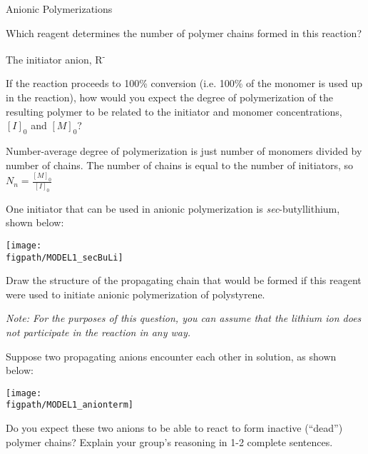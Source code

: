 \begin{activity}{Anionic Polymerizations}
\begin{ctqs}

	
	\question Which reagent determines the number of polymer chains formed in this reaction?
	
		\begin{solution}[0.25in]
			The initiator anion, R\textsuperscript{-}
		\end{solution}
	
	\question If the reaction proceeds to 100\% conversion (i.e. 100\% of the monomer is used up in the reaction), how would you expect the degree of polymerization of the resulting polymer to be related to the initiator and monomer concentrations, $[I]_0$ and $[M]_0$?
	
		\begin{solution}[0.5in]
			Number-average degree of polymerization is just number of monomers divided by number of chains.  The number of chains is equal to the number of initiators, so $N_n = \frac{[M]_0}{[I]_0}$
		\end{solution}
	
	\question One initiator that can be used in anionic polymerization is \emph{sec}-butyllithium, shown below:
	 \label{\labelbase:ctq:ps-anionic-prop}
	
	\centerline{\texttt{[image: \\figpath/MODEL1\_secBuLi]}}
	 	
	 	Draw the structure of the propagating chain that would be formed if this reagent were used to initiate anionic polymerization of polystyrene.
	 	
	 	\emph{Note: For the purposes of this question, you can assume that the lithium ion does not participate in the reaction in any way.}
	
		\begin{solution}[1in]
		\studentdisplay{}
		\end{solution}
	
	\question Suppose two propagating anions encounter each other in solution, as shown below:
	
	\centerline{\texttt{[image: \\figpath/MODEL1\_anionterm]}}
	
		Do you expect these two anions to be able to react to form inactive (``dead'') polymer chains?  Explain your group's reasoning in 1-2 complete sentences.
	

\end{ctqs}
\end{activity}
